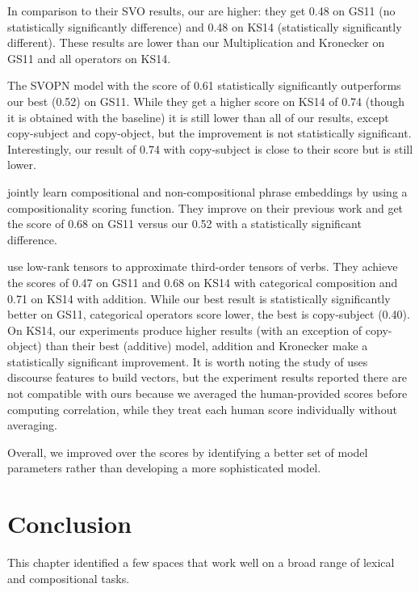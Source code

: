 In comparison to their SVO results, our are higher: they get 0.48 on GS11 (no statistically significantly difference) and 0.48 on KS14 (statistically significantly different). These results are lower than our Multiplication and Kronecker on GS11 and all operators on KS14.

The SVOPN model with the score of 0.61 statistically significantly outperforms our best (0.52) on GS11. While they get a higher score on KS14 of 0.74 (though it is obtained with the  baseline) it is still lower than all of our results, except copy-subject and copy-object, but the improvement is not statistically significant. Interestingly, our result of 0.74 with copy-subject is close to their score but is still lower.

 jointly learn compositional and non-compositional phrase embeddings by using a compositionality scoring function. They improve on their previous work and get the score of 0.68 on GS11 versus our 0.52 with a statistically significant difference.

 use low-rank tensors to approximate third-order tensors of verbs. They achieve the scores of 0.47 on GS11 and 0.68 on KS14 with categorical composition and 0.71 on KS14 with addition. While our best result is statistically significantly better on GS11, categorical operators score lower, the best is copy-subject (0.40). On KS14, our experiments produce higher results (with an exception of copy-object) than their best (additive) model, addition and Kronecker make a statistically significant improvement. It is worth noting the study of  uses discourse features to build vectors, but the experiment results reported there are not compatible with ours because we averaged the human-provided scores before computing correlation, while they treat each human score individually without averaging.

Overall, we improved over the scores by identifying a better set of model parameters rather than developing a more sophisticated model.

\section{Conclusion}
\label{sec:conclusion-universal}

This chapter identified a few spaces that work well on a broad range of lexical and compositional tasks.


